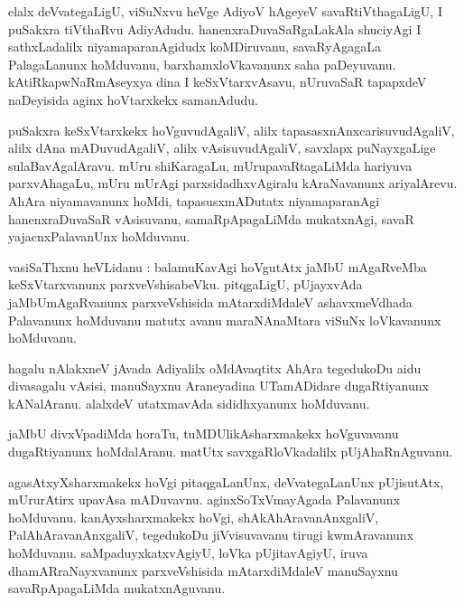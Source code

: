 \documentclass{article}
\begin{document}
\begin{mn}
elalx deVvategaLigU, viSuNxvu heVge AdiyoV hAgeyeV savaRtiVthagaLigU, I puSakxra tiVthaRvu 
AdiyAdudu. hanenxraDuvaSaRgaLakAla shuciyAgi I sathxLadalilx niyamaparanAgidudx koMDiruvanu, 
savaRyAgagaLa PalagaLanunx hoMduvanu, barxhamxloVkavanunx saha paDeyuvanu.
kAtiRkapwNaRmAseyxya dina I keSxVtarxvAsavu, nUruvaSaR tapapxdeV naDeyisida aginx hoVtarxkekx 
samanAdudu.
\end{mn}

\begin{mn}
puSakxra keSxVtarxkekx hoVguvudAgaliV, alilx tapasasxnAnxcarisuvudAgaliV, alilx dAna 
mADuvudAgaliV, alilx vAsisuvudAgaliV, savxlapx puNayxgaLige sulaBavAgalAravu. mUru shiKaragaLu,
mUrupavaRtagaLiMda hariyuva parxvAhagaLu, mUru mUrAgi parxsidadhxvAgiralu kAraNavanunx ariyalArevu. 
AhAra niyamavanunx hoMdi, tapasusxmADutatx niyamaparanAgi hanenxraDuvaSaR vAsisuvanu, 
samaRpApagaLiMda mukatxnAgi, savaR yajacnxPalavanUnx hoMduvanu.
\end{mn}


\begin{mn}
vasiSaThxnu heVLidanu : balamuKavAgi hoVgutAtx jaMbU mAgaRveMba keSxVtarxvanunx parxveVshisabeVku.
pitqgaLigU, pUjayxvAda jaMbUmAgaRvanunx parxveVshisida mAtarxdiMdaleV ashavxmeVdhada Palavanunx 
hoMduvanu matutx avanu maraNAnaMtara viSuNx loVkavanunx hoMduvanu.
\end{mn}

\begin{mn}
hagalu nAlakxneV jAvada Adiyalilx oMdAvaqtitx AhAra tegedukoDu aidu divasagalu vAsisi,
manuSayxnu Araneyadina UTamADidare dugaRtiyanunx kANalAranu. alalxdeV utatxmavAda sididhxyanunx 
hoMduvanu.
\end{mn}

\begin{mn}
jaMbU divxVpadiMda horaTu, tuMDUlikAsharxmakekx hoVguvavanu dugaRtiyanunx hoMdalAranu. matUtx 
savxgaRloVkadalilx pUjAhaRnAguvanu.
\end{mn}

\begin{mn}
agasAtxyXsharxmakekx hoVgi pitaqgaLanUnx, deVvategaLanUnx pUjisutAtx, mUrurAtirx upavAsa mADuvavnu.
aginxSoTxVmayAgada Palavanunx hoMduvanu. kanAyxsharxmakekx hoVgi, shAkAhAravanAnxgaliV, 
PalAhAravanAnxgaliV, tegedukoDu jiVvisuvavanu tirugi kwmAravanunx hoMduvanu. saMpaduyxkatxvAgiyU,
loVka pUjitavAgiyU, iruva dhamARraNayxvanunx parxveVshisida mAtarxdiMdaleV manuSayxnu 
savaRpApagaLiMda mukatxnAguvanu. 
\end{mn}
\end{document}
